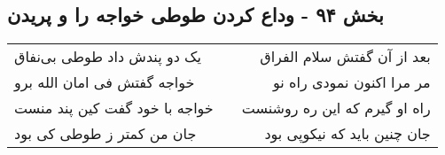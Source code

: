 \begin{center}
\section*{بخش ۹۴ - وداع کردن طوطی خواجه را و پریدن}
\label{sec:sh094}
\begin{longtable}{l p{0.5cm} r}
یک دو پندش داد طوطی بی‌نفاق
&&
بعد از آن گفتش سلام الفراق
\\
خواجه گفتش فی امان الله برو
&&
مر مرا اکنون نمودی راه نو
\\
خواجه با خود گفت کین پند منست
&&
راه او گیرم که این ره روشنست
\\
جان من کمتر ز طوطی کی بود
&&
جان چنین باید که نیکوپی بود
\\
\end{longtable}
\end{center}
